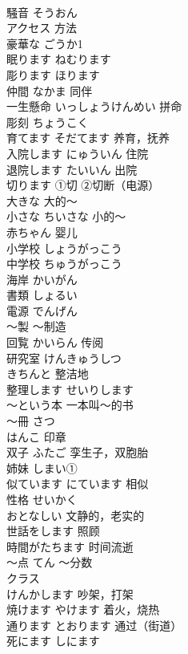 \documentclass[8pt]{extreport}
\begin{document}
\begin{CJK}{UTF8}{min}
\\	騒音	そうおん	
\\	アクセス	方法	
\\	豪華な	ごうか1	
\\	眠ります	ねむります	
\\	彫ります	ほります	
\\	仲間	なかま 同伴	
\\	一生懸命	いっしょうけんめい 拼命	
\\	彫刻	ちょうこく	
\\	育てます	そだてます 养育，抚养	
\\	入院します	にゅういん 住院	
\\	退院します	たいいん 出院	
\\	切ります	①切 ②切断（电源）	
\\	大きな	大的～	
\\	小さな	ちいさな 小的～	
\\	赤ちゃん	婴儿	
\\	小学校	しょうがっこう	
\\	中学校	ちゅうがっこう	
\\	海岸	かいがん	
\\	書類	しょるい	
\\	電源	でんげん	
\\	〜製	～制造	
\\	回覧	かいらん 传阅	
\\	研究室	けんきゅうしつ	
\\	きちんと	整洁地	
\\	整理します	せいりします	
\\	〜という本	一本叫～的书	
\\	～冊	さつ	
\\	はんこ	印章	
\\	双子	ふたご 孪生子，双胞胎	
\\	姉妹	しまい①	
\\	似ています	にています 相似	
\\	性格	せいかく	
\\	おとなしい	文静的，老实的	
\\	世話をします	照顾	
\\	時間がたちます	时间流逝	
\\	〜点	てん 〜分数	
\\	クラス	
\\	けんかします	吵架，打架	
\\	焼けます	やけます 着火，烧热	
\\	通ります	とおります 通过（街道）	
\\	死にます	しにます	

\end{CJK}
\end{document}
